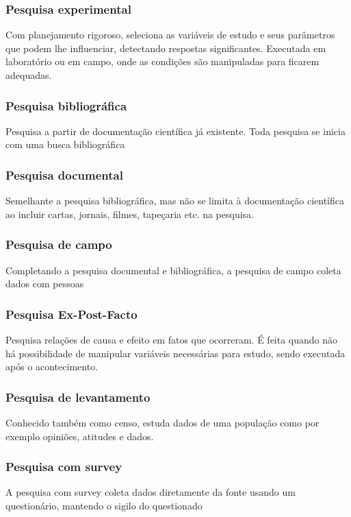 \subsubsection{Pesquisa experimental}
Com planejamento rigoroso, seleciona as variáveis de estudo e seus parâmetros que podem lhe influenciar, detectando respostas significantes. Executada em laboratório ou em campo, onde as condições são manipuladas para ficarem adequadas.

\subsubsection{Pesquisa bibliográfica}
Pesquisa a partir de documentação científica já existente. Toda pesquisa se inicia com uma busca bibliográfica

\subsubsection{Pesquisa documental}
Semelhante a pesquisa bibliográfica, mas não se limita à documentação científica ao incluir cartas, jornais, filmes, tapeçaria etc. na pesquisa.

\subsubsection{Pesquisa de campo}
Completando a pesquisa documental e bibliográfica, a pesquisa de campo coleta dados com pessoas

\subsubsection{Pesquisa Ex-Post-Facto}
Pesquisa relações de causa e efeito em fatos que ocorreram. É feita quando não há possibilidade de manipular variáveis necessárias para estudo, sendo executada após o acontecimento.

\subsubsection{Pesquisa de levantamento}
Conhecido também como censo, estuda dados de uma população como por exemplo opiniões, atitudes e dados. 

\subsubsection{Pesquisa com survey}
A pesquisa com survey coleta dados diretamente da fonte usando um questionário, mantendo o sigilo do questionado

